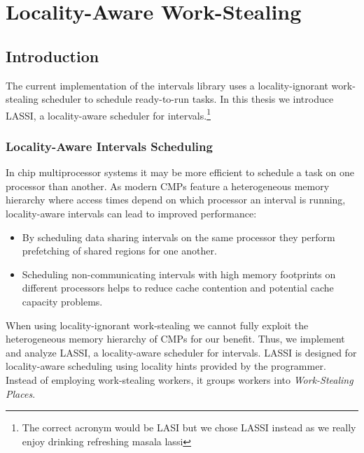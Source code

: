 
\part{Locality-Aware Work-Stealing}
\label{part:locality}

\chapter{Introduction}
\label{chap:locality-introduction}

The current implementation of the intervals library uses a
locality-ignorant work-stealing scheduler to schedule ready-to-run
tasks. In this thesis we introduce LASSI, a locality-aware scheduler
for intervals.\footnote{The correct acronym would be LASI but we chose
  LASSI instead as we really enjoy drinking refreshing masala lassi
  \smiley}

\section{Locality-Aware Intervals Scheduling}
\label{sec:locality-introduction-locality-aware-intervals-scheduling}

In chip multiprocessor systems it may be more efficient to schedule a
task on one processor than another. As modern CMPs feature a
heterogeneous memory hierarchy where access times depend on which
processor an interval is running, locality-aware intervals can lead to
improved performance:

\begin{itemize}
\item By scheduling data sharing intervals on the same processor they
  perform prefetching of shared regions for one another.
\item Scheduling non-communicating intervals with high memory
  footprints on different processors helps to reduce cache contention
  and potential cache capacity problems.
\end{itemize}

When using locality-ignorant work-stealing we cannot fully exploit the
heterogeneous memory hierarchy of CMPs for our benefit. Thus, we
implement and analyze LASSI, a locality-aware scheduler for
intervals. LASSI is designed for locality-aware scheduling using
locality hints provided by the programmer. Instead of employing
work-stealing workers, it groups workers into \emph{Work-Stealing
  Places}.

